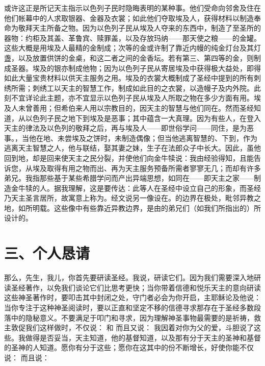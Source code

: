 或许这正是所记天主指示以色列子民时隐晦表明的某种事。他们受命向邻舍及住在他们帐幕中的人求取银器、金器及衣裳；如此他们夺取埃及人，获得材料以制造奉命为敬拜天主所备之物。因为以色列子民从埃及人夺来的东西中，制造了至圣所的器物：约柜及其盖、革鲁宾、赎罪盖，以及存放玛纳——那天使之粮——的金罐。这些大概是用埃及人最精的金制成；次等的金或许制了靠近内幔的纯金灯台及其灯盏，以及放置供饼的金桌，和这二者之间的金香坛。若有第三、第四等的金，则制成圣器。埃及的银亦制成他物；因为以色列子民从寄居埃及中获得极大益处，即得如此大量宝贵材料以供天主服务之用。埃及的衣裳大概制成了圣经中提到的所有刺绣所需；刺绣工以天主的智慧工作，制成如此目的之衣裳，以造幔子及内外院。此刻不宜详论此主题，亦不宜显示以色列子民从埃及人所取之物在多少方面有用。埃及人未曾善用；但希伯来人用以宗教目的，因天主的智慧与他们同在。然而圣经知道，从以色列子民之地下到埃及是恶事；其中蕴含一大真理。因为有些人，在登入天主的律法及以色列的敬拜之后，再与埃及人——即世俗学问——同住，是为恶事。，当他在地、未尝埃及之饼时，未制造偶像；但当他逃离智慧的、下到，作为逃离天主智慧之人，他与联结，娶其妻之妹，生子在法郎众子中长大。因此，虽他回到地，却是回来使天主之民分裂，并使他们向金牛犊说：我由经验得知，且能告诉您，从埃及取得有用之物而出、再为天主服务预备所需者寥寥无几；而却有许多弟兄。我指那些基于某些希腊学问而产出异端思想，如同在——即天主之家——制造金牛犊的人。据我理解，这是要传达：此等人在圣经中设立自己的形象，而圣经乃天主圣言居所，故寓意上称为。经文说另一像设在。的边界在极处，毗邻异教之地，如所明载。这些像中有些靠近异教边界，是由的弟兄们（如我们所指出的）所设计的。\par


\section{三、个人恳请}

那么，先生，我儿，你首先要研读圣经。我说，研读它们。因为我们需要深入地研读圣经著作，以免我们谈论它们比思考更快；当你带着信德和悦乐天主的意向研读这些神圣著作时，要叩击其中封闭之处，守门者必会为你开启，主耶稣论及他说：  当你专注于这种神圣阅读时，要以正直和坚定不移的信德寻求那存在于圣经多数段落中的隐秘意义。不要满足于叩门和寻求，因为理解神圣事物最需要的是祈祷，救主敦促我们这样做时，不仅说：  和  而且又说： 我因着对你为父的爱，斗胆说了这些。我做得是否妥当，天主知道，他的基督知道，以及那有分于天主的圣神和基督的圣神的人知道。愿你有分于这些；愿你在这其中的份不断增长，好使你能不仅说：  而且说：\par

